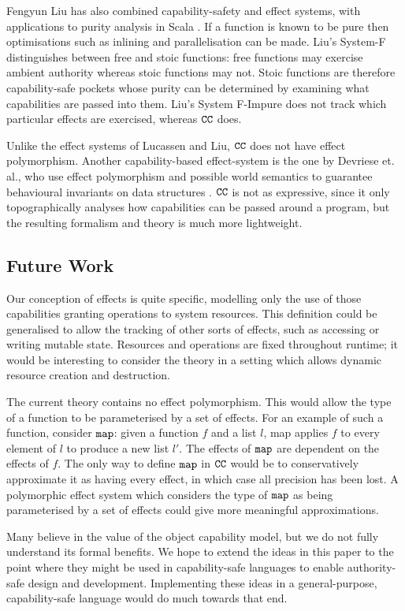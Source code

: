 Fengyun Liu has also combined capability-safety and effect systems, with applications to purity analysis in Scala \cite{liu16}. If a function is known to be pure then optimisations such as inlining and parallelisation can be made. Liu's System-F distinguishes between free and stoic functions: free functions may exercise ambient authority whereas stoic functions may not. Stoic functions are therefore capability-safe pockets whose purity can be determined by examining what capabilities are passed into them. Liu's System F-Impure does not track which particular effects are exercised, whereas $\mathtt{CC}$ does.

Unlike the effect systems of Lucassen and Liu, $\mathtt{CC}$ does not have effect polymorphism. Another capability-based effect-system is the one by Devriese et. al., who use effect polymorphism and possible world semantics to guarantee behavioural invariants on data structures \cite{devriese16}. $\mathtt{CC}$ is not as expressive, since it only topographically analyses how capabilities can be passed around a program, but the resulting formalism and theory is much more lightweight.

\subsection{Future Work}

Our conception of effects is quite specific, modelling only the use of those capabilities granting operations to system resources. This definition could be generalised to allow the tracking of other sorts of effects, such as accessing or writing mutable state. Resources and operations are fixed throughout runtime; it would be interesting to consider the theory in a setting which allows dynamic resource creation and destruction.

The current theory contains no effect polymorphism. This would allow the type of a function to be parameterised by a set of effects. For an example of such a function, consider $\mathtt{map}$: given a function $f$ and a list $l$, map applies $f$ to every element of $l$ to produce a new list $l'$. The effects of $\mathtt{map}$ are dependent on the effects of $f$. The only way to define $\mathtt{map}$ in $\mathtt{CC}$ would be to conservatively approximate it as having every effect, in which case all precision has been lost. A polymorphic effect system which considers the type of $\mathtt{map}$ as being parameterised by a set of effects could give more meaningful approximations.

Many believe in the value of the object capability model, but we do not fully understand its formal benefits. We hope to extend the ideas in this paper to the point where they might be used in capability-safe languages to enable authority-safe design and development. Implementing these ideas in a general-purpose, capability-safe language would do much towards that end.







